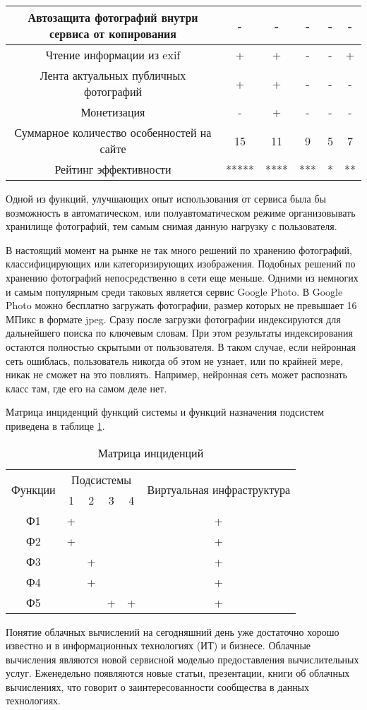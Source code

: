 \begin{table}[H]
\begin{tabular}{|c|c|c|c|c|c|}
  \hline Автозащита фотографий внутри сервиса от копирования & - & - & - & - & - \\ 
  \hline Чтение информации из exif & + & + & - & - & + \\ 
  \hline Лента актуальных публичных фотографий & + & + & - & - & - \\ 
  \hline Монетизация & - & + & - & - & - \\ 
  \hline Суммарное количество особенностей на сайте & 15 & 11 & 9 & 5 & 7 \\ 
  \hline Рейтинг эффективности & ***** & **** & *** & * & ** \\
  \hline
  \end{tabular}
\end{table}

Одной из функций, улучшающих опыт использования от сервиса была бы возможность в автоматическом, или полуавтоматическом режиме организовывать хранилище фотографий, тем самым снимая данную нагрузку с пользователя.

В настоящий момент на рынке не так много решений по хранению фотографий, классифицирующих или категоризирующих изображения.
Подобных решений по хранению фотографий непосредственно в сети еще меньше.
Одними из немногих  и самым популярным среди таковых является сервис Google Photo. 
В Google Photo можно бесплатно загружать фотографии, размер которых не превышает 16 МПикс в формате jpeg. 
Сразу после загрузки фотографии индексируются для дальнейшего поиска по ключевым словам.
При этом результаты индексирования остаются полностью скрытыми от пользователя. 
В таком случае, если нейронная сеть ошиблась, пользователь никогда об этом не узнает, или по крайней мере, никак не сможет на это повлиять. 
Например, нейронная сеть может распознать класс там, где его на самом деле нет.

Матрица инциденций функций системы и функций назначения подсистем приведена в таблице \ref{inc-matrix}.
\begin{table}[H]
  \caption{Матрица инциденций}\label{inc-matrix}
  \begin{tabular}{|c|c|c|c|c|c|}
  \hline \multirow{2}{*}{Функции} & \multicolumn{4}{|c|}{Подсистемы} & \multirow{2}{*}{Виртуальная инфраструктура} \\
  \cline{2-5} & 1 & 2 & 3 & 4 & \\
  \hline Ф1 & + & & & & + \\
  \hline Ф2 & + & & & & + \\
  \hline Ф3 & & + & & & + \\
  \hline Ф4 & & + & & & + \\
  \hline Ф5 & & & + & + & + \\
  \hline 
  \end{tabular}
\end{table}
Понятие облачных вычислений на сегодняшний день уже достаточно хорошо известно и в информационных технологиях (ИТ) и бизнесе.
Облачные вычисления являются новой сервисной моделью предоставления вычислительных услуг.
Еженедельно появляются новые статьи, презентации, книги об облачных вычислениях, что говорит о заинтересованности сообщества в данных технологиях.

